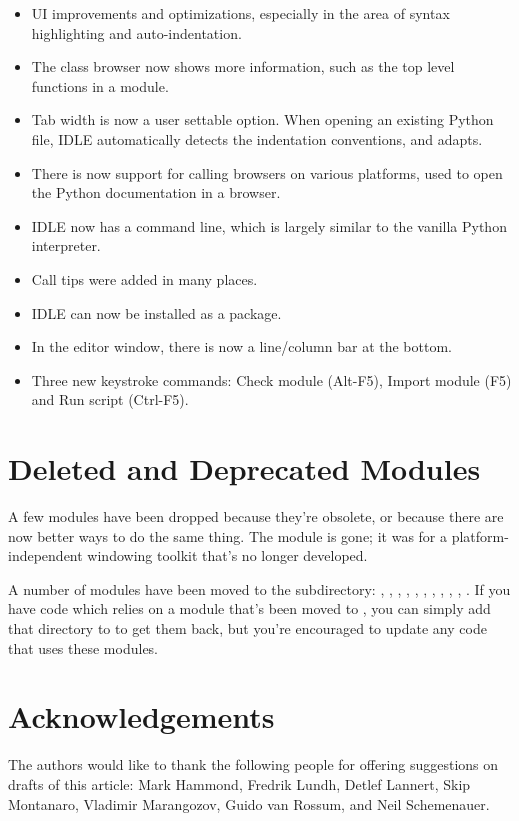 \documentclass{howto}
\begin{document}
\begin{itemize}
\item  UI improvements and optimizations,
especially in the area of syntax highlighting and auto-indentation.

\item The class browser now shows more information, such as the top
level functions in a module.

\item Tab width is now a user settable option. When opening an existing Python
file, IDLE automatically detects the indentation conventions, and adapts.

\item There is now support for calling browsers on various platforms,
used to open the Python documentation in a browser.

\item IDLE now has a command line, which is largely similar to 
the vanilla Python interpreter.

\item Call tips were added in many places.

\item IDLE can now be installed as a package.

\item In the editor window, there is now a line/column bar at the bottom.

\item Three new keystroke commands: Check module (Alt-F5), Import
module (F5) and Run script (Ctrl-F5).

\end{itemize}

\section{Deleted and Deprecated Modules}

A few modules have been dropped because they're obsolete, or because
there are now better ways to do the same thing.  The 
module is gone; it was for a platform-independent windowing toolkit
that's no longer developed.  

A number of modules have been moved to the
 subdirectory:
, , , , 
, , , 
, , , . 
If you have code which relies on a module  that's been moved to
, you can simply add that directory to   
to get them back, but you're encouraged to update any code that uses
these modules.

\section{Acknowledgements}

The authors would like to thank the following people for offering
suggestions on drafts of this article: Mark Hammond, Fredrik Lundh, 
Detlef Lannert, Skip Montanaro, Vladimir Marangozov, Guido van Rossum, 
and Neil Schemenauer.
\end{document}
